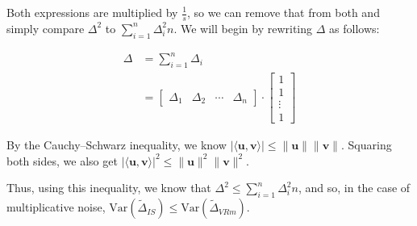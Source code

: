 \documentclass[11pt, margin=1in]{article}
\begin{document}
Both expressions are multiplied by $\frac{1}{s}$, so we can remove that from both and simply compare $\Delta^2$ to $\sum_{i = 1}^{n} \Delta_i^2 n$.
We will begin by rewriting $\Delta$ as follows:

\[
\begin{aligned}
\Delta &= \sum_{i = 1}^{n}\Delta_i \\
&= \begin{bmatrix} \Delta_1 & \Delta_2 & \cdots & \Delta_n \end{bmatrix} \cdot \begin{bmatrix} 1 \\ 1 \\ \vdots \\ 1 \end{bmatrix}
\end{aligned}
\]

By the Cauchy–Schwarz inequality, we know $|\langle \mathbf{u}, \mathbf{v} \rangle| \leq \|\mathbf{u}\| \|\mathbf{v}\|$.
Squaring both sides, we also get $|\langle \mathbf{u}, \mathbf{v} \rangle|^2 \leq \|\mathbf{u}\|^2 \|\mathbf{v}\|^2$.

Thus, using this inequality, we know that $\Delta^2 \leq \sum_{i = 1}^{n} \Delta_i^2 n$, and so, in the case of multiplicative noise, $\mathrm{Var}\left(\tilde{\Delta}_{IS}\right) \leq \mathrm{Var}\left(\tilde{\Delta}_{VRm}\right)$.
\end{document}
